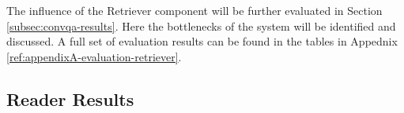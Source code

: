 


The influence of the Retriever component will be further evaluated in Section \ref{subsec:convqa-results}. Here the bottlenecks of the system will be identified and discussed. A full set of evaluation results can be found in the tables in Appednix \ref{ref:appendixA-evaluation-retriever}.


\subsection{Reader Results}
\label{subsec:reader-results}

